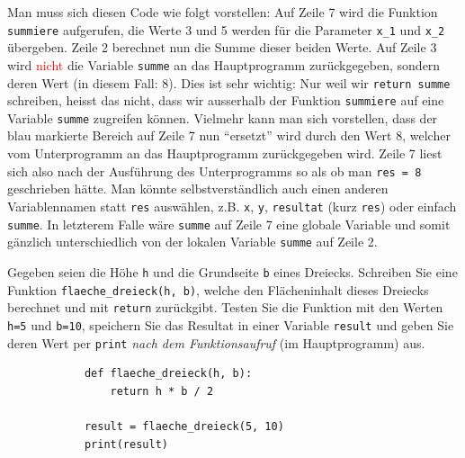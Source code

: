 \begin{myexample}
\begin{myattention}
	Man muss sich diesen Code wie folgt vorstellen: Auf Zeile 7 wird die Funktion \lstinline|summiere| aufgerufen, die Werte 3 und 5 werden für die Parameter \lstinline|x_1| und \lstinline|x_2| übergeben. Zeile 2 berechnet nun die Summe dieser beiden Werte. Auf Zeile 3 wird \textcolor{red}{nicht} die Variable \lstinline|summe| an das Hauptprogramm zurückgegeben, sondern deren Wert (in diesem Fall: 8). Dies ist sehr wichtig: Nur weil wir \lstinline|return summe| schreiben, heisst das nicht, dass wir ausserhalb der Funktion \lstinline|summiere| auf eine Variable \lstinline|summe| zugreifen können. Vielmehr kann man sich vorstellen, dass der blau markierte Bereich auf Zeile 7 nun \enquote{ersetzt} wird durch den Wert 8, welcher vom Unterprogramm an das Hauptprogramm zurückgegeben wird. Zeile 7 liest sich also nach der Ausführung des Unterprogramms so als ob man \lstinline|res = 8| geschrieben hätte. Man könnte selbstverständlich auch einen anderen Variablennamen statt \lstinline|res| auswählen, z.B. \lstinline|x|, \lstinline|y|, \lstinline|resultat| (kurz \lstinline|res|) oder einfach \lstinline|summe|. In letzterem Falle wäre \lstinline|summe| auf Zeile 7 eine globale Variable und somit gänzlich unterschiedlich von der lokalen Variable \lstinline|summe| auf Zeile 2.
\end{myattention}
\end{myexample}

\begin{myexercise}\label{ex:dreieck-return}
	Gegeben seien die Höhe \texttt{h} und die Grundseite \texttt{b} eines Dreiecks. Schreiben Sie eine Funktion \lstinline|flaeche_dreieck(h, b)|, welche den Flächeninhalt dieses Dreiecks berechnet und mit \lstinline|return| zurückgibt. Testen Sie die Funktion mit den Werten \lstinline|h=5| und \lstinline|b=10|, speichern Sie das Resultat in einer Variable \lstinline|result| und geben Sie deren Wert per \lstinline|print| \textit{nach dem Funktionsaufruf} (im Hauptprogramm) aus.

	\begin{myanswer}
		\begin{lstlisting}
			def flaeche_dreieck(h, b):
				return h * b / 2

			result = flaeche_dreieck(5, 10)
			print(result)
	\end{lstlisting}
	\end{myanswer}
\end{myexercise}

